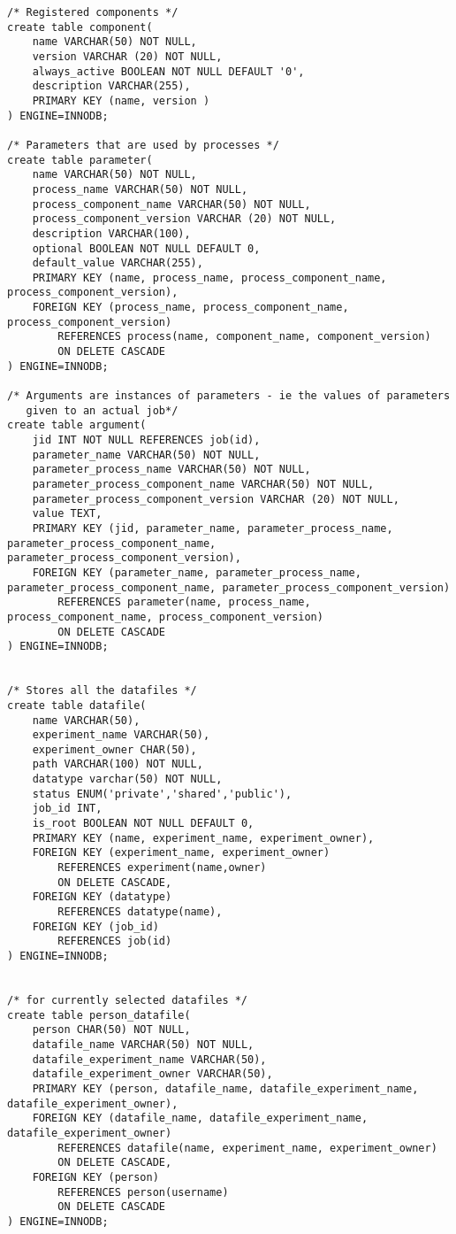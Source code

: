 \begin{tiny}
\begin{verbatim}
/* Registered components */
create table component(
	name VARCHAR(50) NOT NULL,
	version VARCHAR (20) NOT NULL,
	always_active BOOLEAN NOT NULL DEFAULT '0',
	description VARCHAR(255),
	PRIMARY KEY (name, version )
) ENGINE=INNODB;

/* Parameters that are used by processes */
create table parameter(
	name VARCHAR(50) NOT NULL,
	process_name VARCHAR(50) NOT NULL,
	process_component_name VARCHAR(50) NOT NULL,
	process_component_version VARCHAR (20) NOT NULL,
	description VARCHAR(100),
	optional BOOLEAN NOT NULL DEFAULT 0,
	default_value VARCHAR(255),
	PRIMARY KEY (name, process_name, process_component_name, process_component_version),
	FOREIGN KEY (process_name, process_component_name, process_component_version) 
		REFERENCES process(name, component_name, component_version) 
		ON DELETE CASCADE
) ENGINE=INNODB;

/* Arguments are instances of parameters - ie the values of parameters
   given to an actual job*/
create table argument(
	jid INT NOT NULL REFERENCES job(id),
	parameter_name VARCHAR(50) NOT NULL,
	parameter_process_name VARCHAR(50) NOT NULL,
	parameter_process_component_name VARCHAR(50) NOT NULL,
	parameter_process_component_version VARCHAR (20) NOT NULL,
	value TEXT,
	PRIMARY KEY (jid, parameter_name, parameter_process_name, parameter_process_component_name, parameter_process_component_version),
	FOREIGN KEY (parameter_name, parameter_process_name, parameter_process_component_name, parameter_process_component_version)
		REFERENCES parameter(name, process_name, process_component_name, process_component_version)
		ON DELETE CASCADE
) ENGINE=INNODB;


/* Stores all the datafiles */
create table datafile(
	name VARCHAR(50),
	experiment_name VARCHAR(50),
	experiment_owner CHAR(50),
	path VARCHAR(100) NOT NULL,
	datatype varchar(50) NOT NULL,
	status ENUM('private','shared','public'),
	job_id INT,
	is_root BOOLEAN NOT NULL DEFAULT 0,
	PRIMARY KEY (name, experiment_name, experiment_owner),
	FOREIGN KEY (experiment_name, experiment_owner)
		REFERENCES experiment(name,owner)
		ON DELETE CASCADE,
	FOREIGN KEY (datatype) 
		REFERENCES datatype(name),
	FOREIGN KEY (job_id)
		REFERENCES job(id)
) ENGINE=INNODB;


/* for currently selected datafiles */
create table person_datafile(
	person CHAR(50) NOT NULL,
	datafile_name VARCHAR(50) NOT NULL,
	datafile_experiment_name VARCHAR(50),
	datafile_experiment_owner VARCHAR(50),
	PRIMARY KEY (person, datafile_name, datafile_experiment_name, datafile_experiment_owner),
	FOREIGN KEY (datafile_name, datafile_experiment_name, datafile_experiment_owner)
		REFERENCES datafile(name, experiment_name, experiment_owner)
		ON DELETE CASCADE,
	FOREIGN KEY (person)
		REFERENCES person(username)
		ON DELETE CASCADE
) ENGINE=INNODB;



\end{verbatim}
\end{tiny}

